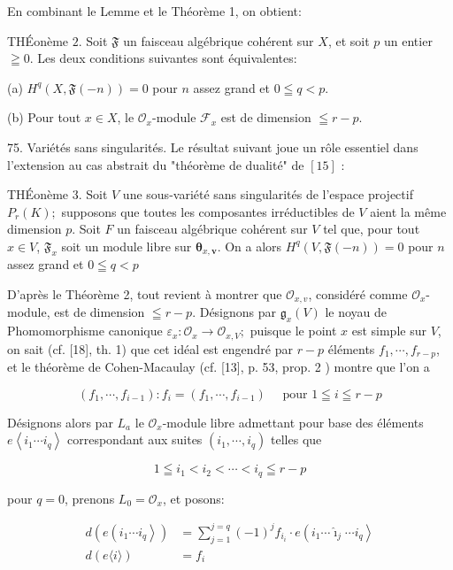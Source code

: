 En combinant le Lemme et le Théorème 1, on obtient:

THÉonème $2 .$ Soit $\mathfrak{F}$ un faisceau algébrique cohérent sur $X$, et soit $p$ un entier $\geqq 0$. Les deux conditions suivantes sont équivalentes:

(a) $H^{q}(X, \mathfrak{F}(-n))=0$ pour $n$ assez grand et $0 \leqq q<p$.

(b) Pour tout $x \in X$, le $\mathcal{O}_{x}$-module $\mathcal{F}_{x}$ est de dimension $\leqq r-p$.

75. Variétés sans singularités. Le résultat suivant joue un rôle essentiel dans l'extension au cas abstrait du "théorème de dualité" de $[15]$ :

THÉonème 3. Soit $V$ une sous-variété sans singularités de l'espace projectif $P_{r}(K) ;$ supposons que toutes les composantes irréductibles de $V$ aient la même dimension $p .$ Soit $F$ un faisceau algébrique cohérent sur $V$ tel que, pour tout $x \in V$, $\mathfrak{F}_{x}$ soit un module libre sur $\boldsymbol{\theta}_{x, \boldsymbol{v}}$. On a alors $H^{q}(V, \mathfrak{F}(-n))=0$ pour $n$ assez grand et $0 \leqq q<p$

D'après le Théorème 2, tout revient à montrer que $\mathcal{O}_{x, v}$, considéré comme $\mathcal{O}_{x}$-module, est de dimension $\leqq r-p$. Désignons par $\mathfrak{g}_{x}(V)$ le noyau de Phomomorphisme canonique $\varepsilon_{x}: \mathcal{O}_{x} \rightarrow \mathcal{O}_{x, V} ;$ puisque le point $x$ est simple sur $V$, on sait (cf. [18], th. 1) que cet idéal est engendré par $r-p$ éléments $f_{1}, \cdots, f_{r-p}$, et le théorème de Cohen-Macaulay (cf. [13], p. 53, prop. 2 ) montre que l'on a

$$
\left(f_{1}, \cdots, f_{i-1}\right): f_{i}=\left(f_{1}, \cdots, f_{i-1}\right) \quad \text { pour } 1 \leqq i \leqq r-p
$$

Désignons alors par $L_{a}$ le $\mathcal{O}_{x}$-module libre admettant pour base des éléments $e\left\langle i_{1} \cdots i_{q}\right\rangle$ correspondant aux suites $\left(i_{1}, \cdots, i_{q}\right)$ telles que

$$
1 \leqq i_{1}<i_{2}<\cdots<i_{q} \leqq r-p
$$

pour $q=0$, prenons $L_{0}=\mathcal{O}_{x}$, et posons:

$$
\begin{aligned}
    d\left(e\left(i_{1} \cdots i_{q}\right\rangle\right) &=\sum_{j=1}^{j=q}(-1)^{j} f_{i_{i}} \cdot e\left(i_{1} \cdots \hat{\imath}_{j} \cdots i_{q}\right\rangle \\
    d(e\langle i\rangle) &=f_{i}
\end{aligned}
$$

